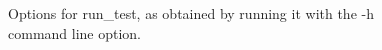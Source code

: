 \begin{figure}
{\footnotesize  }
\caption{Options for {\file run\_test}, as obtained by running it with the
  {\file -h} command line option.} \label{fig:runtest}
\end{figure}
